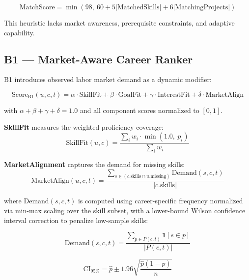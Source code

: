 \documentclass[conference]{IEEEtran}
\begin{document}
\begin{equation}
\text{MatchScore} = \min\!\left(98,\ 60 + 5|\text{MatchedSkills}| + 6|\text{MatchingProjects}|\right)
\label{eq:match}
\end{equation}

\noindent This heuristic lacks market awareness, prerequisite constraints, and adaptive capability.

\subsection{B1 --- Market-Aware Career Ranker}

B1 introduces observed labor market demand as a dynamic modifier:

\begin{equation}
\text{Score}_{\text{B1}}(u,c,t) = \alpha \cdot \text{SkillFit} + \beta \cdot \text{GoalFit} + \gamma \cdot \text{InterestFit} + \delta \cdot \text{MarketAlign}
\label{eq:b1}
\end{equation}

\noindent with $\alpha + \beta + \gamma + \delta = 1.0$ and all component scores normalized to $[0, 1]$.

\textbf{SkillFit} measures the weighted proficiency coverage:
\begin{equation}
\text{SkillFit}(u,c) = \frac{\sum_{i} w_i \cdot \min(1.0,\ p_i)}{\sum_{i} w_i}
\label{eq:skillfit}
\end{equation}

\textbf{MarketAlignment} captures the demand for missing skills:
\begin{equation}
\text{MarketAlign}(u,c,t) = \frac{\sum_{s \in (c.\text{skills} \cap u.\text{missing})} \text{Demand}(s,c,t)}{|c.\text{skills}|}
\label{eq:marketalign}
\end{equation}

\noindent where $\text{Demand}(s,c,t)$ is computed using career-specific frequency normalized via min-max scaling over the skill subset, with a lower-bound Wilson confidence interval correction to penalize low-sample skills:

\begin{equation}
\text{Demand}(s,c,t) = \frac{\sum_{p \in P(c,t)} \mathbf{1}[s \in p]}{|P(c,t)|}
\label{eq:demand}
\end{equation}

\begin{equation}
\text{CI}_{95\%} = \hat{p} \pm 1.96 \sqrt{\frac{\hat{p}(1-\hat{p})}{n}}
\label{eq:ci}
\end{equation}
\end{document}
